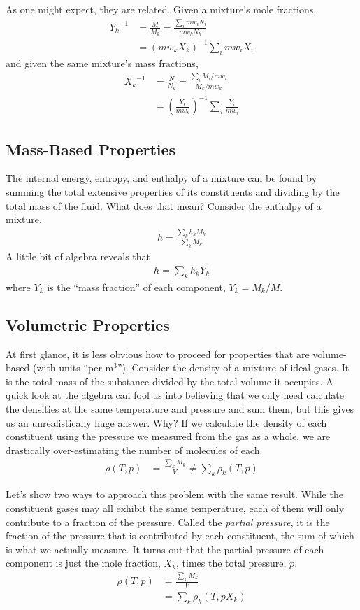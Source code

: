 As one might expect, they are related.  Given a mixture's mole fractions,
\begin{align}
{Y_k}^{-1} &= \frac{M}{M_k} = \frac{\sum_i mw_i N_i}{mw_k N_k}\nonumber\\
 &= (mw_k X_k)^{-1} \sum_i mw_i X_i
\end{align}
and given the same mixture's mass fractions,
\begin{align}
{X_k}^{-1} &= \frac{N}{N_k} = \frac{\sum_i M_i/mw_i}{M_k/mw_k}\nonumber\\
 &= \left(\frac{Y_k}{mw_k}\right)^{-1} \sum_i \frac{Y_i}{mw_i}
\end{align}

\subsection{Mass-Based Properties}
The internal energy, entropy, and enthalpy of a mixture can be found by summing the total extensive properties of its constituents and dividing by the total mass of the fluid.  What does that mean?  Consider the enthalpy of a mixture.
\begin{align}
h = \frac{\sum_k h_k M_k}{\sum_k M_k}
\end{align}
A little bit of algebra reveals that
\begin{align}
h = \sum_k h_k Y_k
\end{align}
where $Y_k$ is the ``mass fraction'' of each component, $Y_k = M_k/M$.

\subsection{Volumetric Properties}
At first glance, it is less obvious how to proceed for properties that are volume-based (with units ``per-m$^3$'').  Consider the density of a mixture of ideal gases.  It is the total mass of the substance divided by the total volume it occupies.  A quick look at the algebra can fool us into believing that we only need calculate the densities at the same temperature and pressure and sum them, but this gives us an unrealistically huge answer.  Why?  If we calculate the density of each constituent using the pressure we measured from the gas as a whole, we are drastically over-estimating the number of molecules of each.
\begin{align}
\rho(T,p) &= \frac{\sum_k M_k}{V} \ne \sum_k \rho_k(T,p)
\end{align}

Let's show two ways to approach this problem with the same result.  While the constituent gases may all exhibit the same temperature, each of them will only contribute to a fraction of the pressure.  Called the \emph{partial pressure}, it is the fraction of the pressure that is contributed by each constituent, the sum of which is what we actually measure.  It turns out that the partial pressure of each component is just the mole fraction, $X_k$, times the total pressure, $p$.
\begin{align}
\rho(T,p) &= \frac{\sum_k M_k}{V} \nonumber\\
 &= \sum_k \rho_k(T,p X_k)
\end{align}

